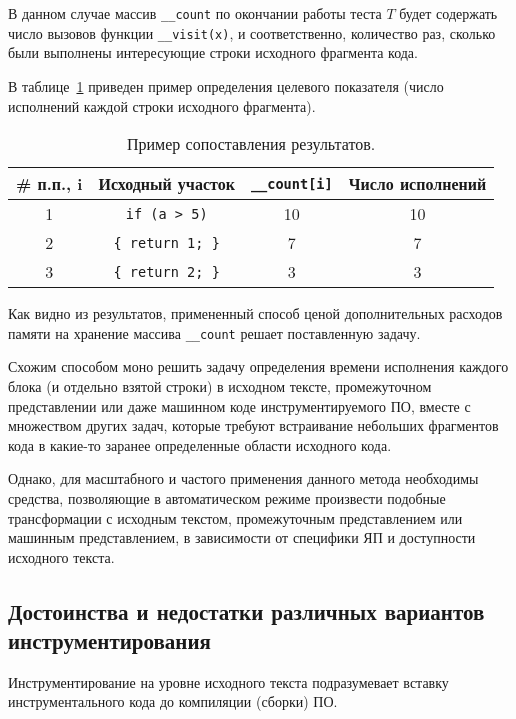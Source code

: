 В данном случае массив \lstinline{__count} по окончании работы теста $T$ будет содержать число вызовов функции \lstinline{__visit(x)}, и соответственно, количество раз, сколько были выполнены интересующие строки исходного фрагмента кода.

В таблице~\ref{table:insrtExampleResults} приведен пример определения целевого показателя (число исполнений каждой строки исходного фрагмента).
\begin{table}[H]
  \captionsetup{skip=5pt}
  \caption{Пример сопоставления результатов.}
  \label{table:insrtExampleResults}
  \centering
  \begin{tabular}{|c|c|c|c|}
    \hline
    \# п.п., i  & Исходный участок            & \lstinline!__count[i]!  & Число исполнений  \\ \hline
    1           & \lstinline!if (a > 5)!      & 10                      & 10                \\ \hline
    2           & \lstinline!{ return 1; }!   & 7                       & 7                 \\ \hline
    3           & \lstinline!{ return 2; }!   & 3                       & 3                 \\ \hline
  \end{tabular}
\end{table}

Как видно из результатов, примененный способ ценой дополнительных расходов памяти на хранение массива \lstinline{__count} решает поставленную задачу.

Схожим способом моно решить задачу определения времени исполнения каждого блока (и отдельно взятой строки) в исходном тексте, промежуточном представлении или даже машинном коде инструментируемого ПО, вместе с множеством других задач, которые требуют встраивание небольших фрагментов кода в какие-то заранее определенные области исходного кода.

Однако, для масштабного и частого применения данного метода необходимы средства, позволяющие в автоматическом режиме произвести подобные трансформации с исходным текстом, промежуточным представлением или машинным представлением, в зависимости от специфики ЯП и доступности исходного текста.

\subsection{Достоинства и недостатки различных вариантов инструментирования}
Инструментирование на уровне исходного текста подразумевает вставку инструментального кода до компиляции (сборки) ПО.

